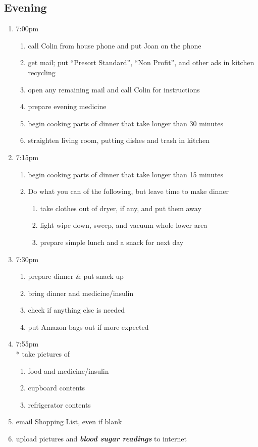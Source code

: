 \documentclass[12pt,letterpaper]{article}
\begin{document}
\begin{multicols}{2}
\subsection*{Evening}
\begin{enumerate}
	\item 7:00pm
		\begin{enumerate}
			\item call Colin from house phone and put Joan on the phone
			\item get mail; put ``Presort Standard'', ``Non Profit'', and other ads in kitchen recycling
			\item open any remaining mail and call Colin for instructions
			\item prepare evening medicine
			\item begin cooking parts of dinner that take longer than 30 minutes
			\item straighten living room, putting dishes and trash in kitchen
		\end{enumerate}
	\item 7:15pm 
		\begin{enumerate}
			\item begin cooking parts of dinner that take longer than 15 minutes
			\item	Do what you can of the following, but leave time to make dinner
				\begin{enumerate}
					\item take clothes out of dryer, if any, and put them away
					\item light wipe down, sweep, and vacuum whole lower area
					\item prepare simple lunch and a snack for next day
				\end{enumerate}
		\end{enumerate}
	\item 7:30pm
		\begin{enumerate}
			\item prepare dinner \& put snack up
			\item bring dinner and medicine/insulin
			\item check if anything else is needed
			\item put Amazon bags out if more expected
		\end{enumerate}
	\item 7:55pm \\*
		take pictures of 
		\begin{enumerate}
			\item food and medicine/insulin
			\item	cupboard contents
			\item	refrigerator contents
		\end{enumerate}
	\item email Shopping List, even if blank
	\item upload pictures and \textit{\textbf{blood sugar readings}} to internet
\end{enumerate}
\end{multicols}
\end{document}
